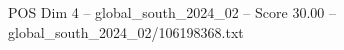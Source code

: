 \begin{textsample}{POS Dim 4 – global\_south\_2024\_02 – Score 30.00 – global\_south\_2024\_02/106198368.txt}
\end{textsample}
